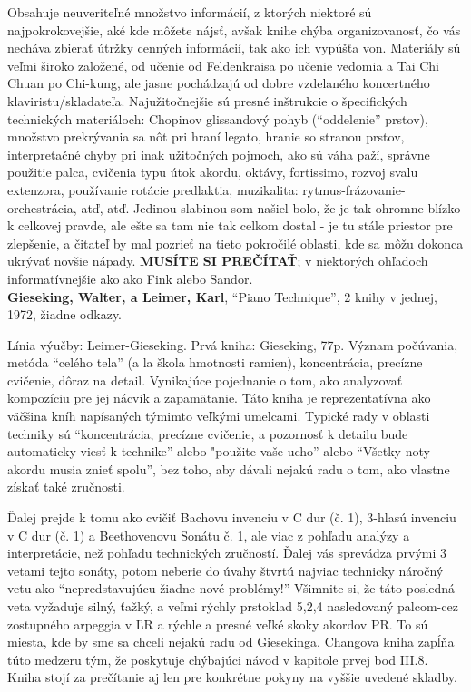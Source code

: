 \documentclass[11pt,a4paper]{book}
\begin{document}
Obsahuje neuveriteľné množstvo informácií, z ktorých niektoré sú najpokrokovejšie, aké kde môžete nájsť, avšak knihe chýba organizovanosť, čo vás necháva zbierať útržky cenných informácií, tak ako ich vypúšťa von. Materiály sú veľmi široko založené, od učenie od Feldenkraisa po učenie vedomia a Tai Chi Chuan po Chi-kung, ale jasne pochádzajú od dobre vzdelaného koncertného klaviristu/skladateľa. Najužitočnejšie sú presné inštrukcie o špecifických technických materiáloch: Chopinov glissandový pohyb (“oddelenie” prstov), množstvo prekrývania sa nôt pri hraní legato, hranie so stranou prstov, interpretačné chyby pri inak užitočných pojmoch, ako sú váha paží, správne použitie palca, cvičenia typu útok akordu, oktávy, fortissimo, rozvoj svalu extenzora, používanie rotácie predlaktia, muzikalita: rytmus-frázovanie-orchestrácia, atď, atď. Jedinou slabinou som našiel bolo, že je tak ohromne blízko k celkovej pravde, ale ešte sa tam nie tak celkom dostal - je tu stále priestor pre zlepšenie, a čitateľ by mal pozrieť na tieto pokročilé oblasti, kde sa môžu dokonca ukrývať novšie nápady. \textbf{MUSÍTE SI PREČÍTAŤ}; v niektorých ohľadoch informatívnejšie ako ako Fink alebo Sandor.
\medskip\\
\textbf{Gieseking, Walter, a Leimer, Karl}, “Piano Technique”, 2 knihy v jednej, 1972, žiadne odkazy.

Línia výučby: Leimer-Gieseking. Prvá kniha: Gieseking, 77p. Význam počúvania, metóda “celého tela” (a la škola hmotnosti ramien), koncentrácia, precízne cvičenie, dôraz na detail. Vynikajúce pojednanie o tom, ako analyzovať kompozíciu pre jej nácvik a zapamätanie. Táto kniha je reprezentatívna ako väčšina kníh napísaných týmimto veľkými umelcami. Typické rady v oblasti techniky sú “koncentrácia, precízne cvičenie, a pozornosť k detailu bude automaticky viesť k technike” alebo "použite vaše ucho” alebo “Všetky noty akordu musia znieť spolu”, bez toho, aby dávali nejakú radu o tom, ako vlastne získať také zručnosti. 

Ďalej prejde k tomu ako cvičiť Bachovu invenciu v C dur (č. 1), 3-hlasú invenciu v C dur (č. 1) a Beethovenovu Sonátu č. 1, ale viac z pohľadu analýzy a interpretácie, než pohľadu technických zručností. Ďalej vás sprevádza prvými 3 vetami tejto sonáty, potom neberie do úvahy štvrtú najviac technicky náročný vetu ako “nepredstavujúcu žiadne nové problémy!” Všimnite si, že táto posledná veta  vyžaduje silný, ťažký, a veľmi rýchly prstoklad 5,2,4 nasledovaný palcom-cez zostupného arpeggia v ĽR a rýchle a presné veľké skoky akordov PR. To sú miesta, kde by sme sa chceli nejakú radu od Giesekinga. Changova kniha zapĺňa túto medzeru tým, že poskytuje chýbajúci návod v kapitole prvej bod III.8. Kniha stojí za prečítanie aj len pre konkrétne pokyny na vyššie uvedené skladby. 
\end{document}
